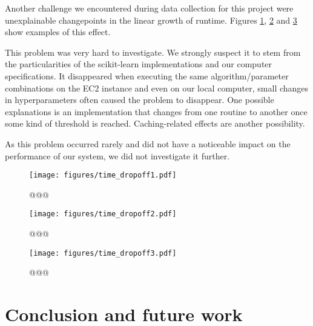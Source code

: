 \documentclass[a4paper,12pt,twoside,openright]{report}
\begin{document}

Another challenge we encountered during data collection for this project were unexplainable changepoints in the linear growth of runtime. Figures \ref{time_dropoff1}, \ref{time_dropoff2} and \ref{time_dropoff3} show examples of this effect.

This problem was very hard to investigate. We strongly suspect it to stem from the particularities of the scikit-learn implementations and our computer specifications. It  disappeared when executing the same algorithm/parameter combinations on the EC2 instance and even on our local computer, small changes in hyperparameters often caused the problem to disappear. One possible explanations is an implementation that changes from one routine to another once some kind of threshold is reached. Caching-related effects are another possibility.

As this problem occurred rarely and did not have a noticeable impact on the performance of our system, we did not investigate it further.



\begin{figure}
\centering
  \texttt{[image: figures/time\_dropoff1.pdf]}
  \caption{@@@}
  \label{time_dropoff1}
\end{figure}
\begin{figure}
\centering
  \texttt{[image: figures/time\_dropoff2.pdf]}
  \caption{@@@}
  \label{time_dropoff2}
\end{figure}
\begin{figure}
\centering
  \texttt{[image: figures/time\_dropoff3.pdf]}
  \caption{@@@}
  \label{time_dropoff3}
\end{figure}



\chapter{Conclusion and future work} 
\end{document}
